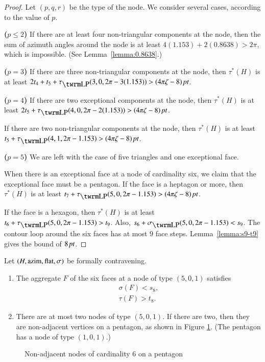 \begin{proof}  Let $(p,q,r)$ be the type of the node.  We consider
several cases, according to the value of $p$.

{\bf($p\le2$)} If there are at least four non-triangular components at
the node, then the sum of azimuth angles around the node is at least
$4(1.153)+2(0.8638)>2\pi$, which is impossible.  (See
Lemma~\ref{lemma:0.8638}.)

{\bf($p=3$)} If there are three non-triangular components at the node,
then $\tau^*(H)$ is at least
$2t_4+t_5+\tauLP(3,0,2\pi-3(1.153))>\squander$.

{\bf($p=4$)} If there are two exceptional components at the node, then
$\tau^*(H)$ is at least $2t_5+\tauLP(4,0,2\pi-2(1.153))>\squander$.

If there are two non-triangular components at the node, then
$\tau^*(H)$ is at least  $t_5+\tauLP(4,1,2\pi-1.153)>\squander$.

{\bf($p=5$)} We are left with the case of five triangles and one
exceptional face.

When there is an exceptional face at a node of cardinality six, we
claim that the exceptional face must be a pentagon. If the face is a
heptagon or more, then $\tau^*(H)$ is at least
$t_7+\tauLP(5,0,2\pi-1.153) > \squander$.

If the face is a hexagon, then $\tau^*(H)$ is at least $t_6 +
\tauLP(5,0,2\pi-1.153) > t_9$. Also, $s_6+\sLP(5,0,2\pi-1.153) <
s_9$. The contour loop around the six faces has at most $9$ face
steps. Lemma~\ref{lemma:s9-t9} gives the bound of $8\,\hbox{\it pt}$.
\end{proof}




\begin{lemma}
    \label{lemma:aggregate6}
    Let $(H,{\operatorname{azim}},\operatorname{flat},\sigma)$ be formally contravening.
    \begin{enumerate}
    \item The aggregate $F$ of the six faces at a node of type
    $(5,0,1)$ satisfies
            $$
            \begin{array}{lll}
            \sigma(F) < s_8,\\
            \tau(F) > t_8.
            \end{array}
            $$
    \item There are at most two nodes of type $(5,0,1)$.  If
        there are two, then they are non-adjacent vertices on a
        pentagon, as shown in Figure \ref{fig:doubledegree6}.  (The
        pentagon has a node of type $(1,0,1)$.)
    \end{enumerate}
\end{lemma}
\begin{figure}[htb]
  \centering
  \caption{Non-adjacent nodes of cardinality $6$ on a pentagon}
  \label{fig:doubledegree6}
\end{figure}

